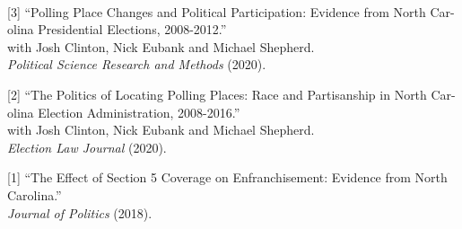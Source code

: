 \documentclass[11pt]{article}
\begin{document}
\newpage
	\begin{minipage}[t]{.21\textwidth}

		\so{ } \hspace*{.2in}  \\
	\end{minipage}
	\begin{minipage}[t]{.79\textwidth}
		[3]\hspace{.1in} ``Polling Place Changes and Political Participation: Evidence from North Car- \\
		\hspace*{.3in} olina Presidential Elections, 2008-2012.'' \\
		\hspace*{.3in} with Josh Clinton, Nick Eubank and Michael Shepherd. \\
		\hspace*{.3in} \emph{Political Science Research and Methods} (2020). \\
		\vspace{-.05in}

	[2]\hspace{.1in} ``The Politics of Locating Polling Places:  Race and Partisanship in North Car-
		\hspace*{.3in} olina Election Administration, 2008-2016.'' \\
			\hspace*{.3in} with Josh Clinton, Nick Eubank and Michael Shepherd. \\
			\hspace*{.3in} \emph{Election Law Journal} (2020).  \\
		\vspace{-.05in}

	[1]\hspace{.1in} ``The Effect of Section 5 Coverage on Enfranchisement: Evidence from North \\
	\hspace*{.3in} Carolina.'' \\
	\hspace*{.3in}  \emph{Journal of Politics} (2018). \\
	\vspace{-.1in}

\end{minipage}



\end{document}
